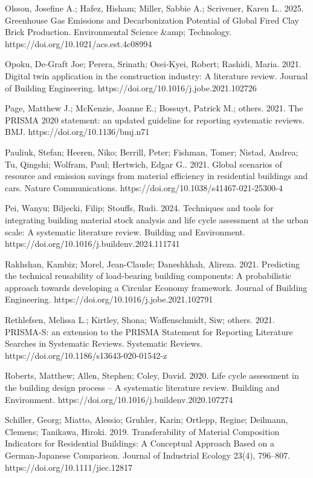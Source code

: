 Olsson, Josefine A.; Hafez, Hisham; Miller, Sabbie A.; Scrivener, Karen L.. 2025. Greenhouse Gas Emissions and Decarbonization Potential of Global Fired Clay Brick Production. Environmental Science \&amp; Technology. https://doi.org/10.1021/acs.est.4c08994

Opoku, De-Graft Joe; Perera, Srinath; Osei-Kyei, Robert; Rashidi, Maria. 2021. Digital twin application in the construction industry: A literature review. Journal of Building Engineering. https://doi.org/10.1016/j.jobe.2021.102726

Page, Matthew J.; McKenzie, Joanne E.; Bossuyt, Patrick M.; others. 2021. The PRISMA 2020 statement: an updated guideline for reporting systematic reviews. BMJ. https://doi.org/10.1136/bmj.n71

Pauliuk, Stefan; Heeren, Niko; Berrill, Peter; Fishman, Tomer; Nistad, Andrea; Tu, Qingshi; Wolfram, Paul; Hertwich, Edgar G.. 2021. Global scenarios of resource and emission savings from material efficiency in residential buildings and cars. Nature Communications. https://doi.org/10.1038/s41467-021-25300-4

Pei, Wanyu; Biljecki, Filip; Stouffs, Rudi. 2024. Techniques and tools for integrating building material stock analysis and life cycle assessment at the urban scale: A systematic literature review. Building and Environment. https://doi.org/10.1016/j.buildenv.2024.111741

Rakhshan, Kambiz; Morel, Jean-Claude; Daneshkhah, Alireza. 2021. Predicting the technical reusability of load-bearing building components: A probabilistic approach towards developing a Circular Economy framework. Journal of Building Engineering. https://doi.org/10.1016/j.jobe.2021.102791

Rethlefsen, Melissa L.; Kirtley, Shona; Waffenschmidt, Siw; others. 2021. PRISMA-S: an extension to the PRISMA Statement for Reporting Literature Searches in Systematic Reviews. Systematic Reviews. https://doi.org/10.1186/s13643-020-01542-z

Roberts, Matthew; Allen, Stephen; Coley, David. 2020. Life cycle assessment in the building design process -- A systematic literature review. Building and Environment. https://doi.org/10.1016/j.buildenv.2020.107274

Schiller, Georg; Miatto, Alessio; Gruhler, Karin; Ortlepp, Regine; Deilmann, Clemens; Tanikawa, Hiroki. 2019. Transferability of Material Composition Indicators for Residential Buildings: A Conceptual Approach Based on a German-Japanese Comparison. Journal of Industrial Ecology 23(4), 796–807. https://doi.org/10.1111/jiec.12817

